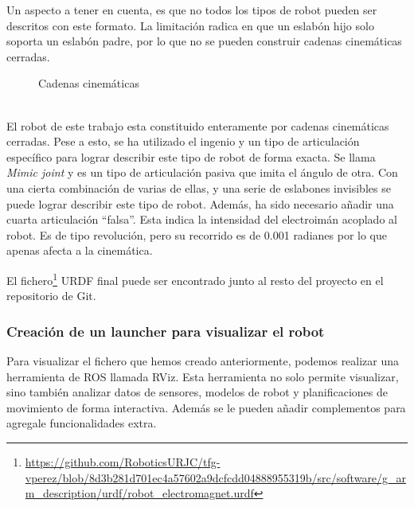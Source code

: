 Un aspecto a tener en cuenta, es que no todos los tipos de robot pueden ser descritos con este formato. La limitación radica en que 
un eslabón hijo solo soporta un eslabón padre, por lo que no se pueden construir cadenas cinemáticas cerradas. \\
\begin{figure} [ht!]
    \centering  
    \hspace{2cm}
    \caption{Cadenas cinemáticas}
  \end{figure}\ 
\\
El robot de este trabajo esta constituido enteramente por cadenas cinemáticas cerradas. Pese a esto, se ha utilizado el ingenio y un tipo de 
articulación específico para lograr describir este tipo de robot de forma exacta. Se llama \textit{Mimic joint} y
es un tipo de articulación pasiva que imita el ángulo de otra. Con una cierta combinación de varias de ellas, y una serie de 
eslabones invisibles se puede lograr describir este tipo de robot. 
Además, ha sido necesario añadir una cuarta articulación \enquote{falsa}. Esta indica la intensidad del electroimán acoplado al robot. 
Es de tipo revolución, pero su recorrido es de 0.001 radianes por lo que apenas afecta a la cinemática. 

El fichero\footnote{\url{https://github.com/RoboticsURJC/tfg-vperez/blob/8d3b281d701ec4a57602a9dcfcdd04888955319b/src/software/g_arm_description/urdf/robot_electromagnet.urdf}} 
URDF final puede ser encontrado junto al resto del proyecto en el repositorio de Git.
\newpage
\subsubsection{Creación de un launcher para visualizar el robot}
\noindent Para visualizar el fichero que hemos creado anteriormente, podemos realizar una herramienta de ROS 
llamada RViz. Esta herramienta no solo permite visualizar, sino también analizar datos de sensores, modelos de robot y 
planificaciones de movimiento de forma interactiva. Además se le pueden añadir complementos para agregale funcionalidades extra. 
\\

